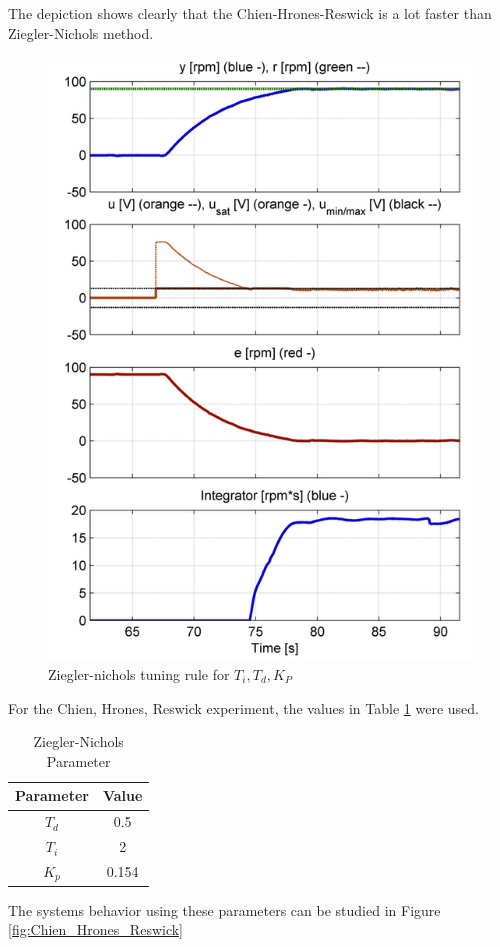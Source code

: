 The depiction shows clearly that the Chien-Hrones-Reswick is a lot faster than Ziegler-Nichols method.

\begin{figure}[H]
\begin{center}
\includegraphics[width=0.5\linewidth]{images/general/PID/Ziegler_nichols}
\end{center}
\caption{Ziegler-nichols tuning rule for $T_{i}, T_{d},K_{P}$}
\label{fig:Ziegler_nichols}
\end{figure}

For the Chien, Hrones, Reswick experiment, the values in Table \ref{tab:chr_params} were used.

\begin{table}[H]
\begin{center}
\begin{tabular}{ |c|c| } 
 \hline
 Parameter & Value\\
 \hline
 $T_{d}$ & 0.5\\  
 \hline
 $T_{i}$ & 2\\
 \hline
 $K_{p}$ & 0.154\\
 \hline
\end{tabular}
\end{center}
\caption{Ziegler-Nichols Parameter}
\label{tab:chr_params}
\end{table}

The systems behavior using these parameters can be studied in Figure \ref{fig:Chien_Hrones_Reswick}

